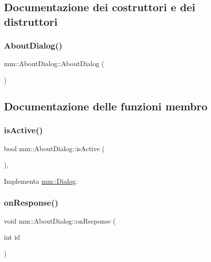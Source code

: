\subsection{Documentazione dei costruttori e dei distruttori}
\mbox{\label{classmm_1_1_about_dialog_a489ffce563c6dae1dfef30518a778197}} 
\subsubsection{\texorpdfstring{About\+Dialog()}{AboutDialog()}}
{\footnotesize\ttfamily mm\+::\+About\+Dialog\+::\+About\+Dialog (\begin{DoxyParamCaption}{ }\end{DoxyParamCaption})}



\subsection{Documentazione delle funzioni membro}
\mbox{\label{classmm_1_1_about_dialog_adc8aec0378d9d146c78eaf9a204dbf27}} 
\subsubsection{\texorpdfstring{is\+Active()}{isActive()}}
{\footnotesize\ttfamily bool mm\+::\+About\+Dialog\+::is\+Active (\begin{DoxyParamCaption}{ }\end{DoxyParamCaption})\hspace{0.3cm}{\ttfamily [override]}, {\ttfamily [virtual]}}



Implementa \hyperlink{classmm_1_1_dialog_a22abaf4e90b6fdca5c20039f6b9e15ac}{mm\+::\+Dialog}.

\mbox{\label{classmm_1_1_about_dialog_a9a5feecb03e737d3bdbbf2a97dd7fbc4}} 
\subsubsection{\texorpdfstring{on\+Response()}{onResponse()}}
{\footnotesize\ttfamily void mm\+::\+About\+Dialog\+::on\+Response (\begin{DoxyParamCaption}\item[{int}]{id }\end{DoxyParamCaption})}

